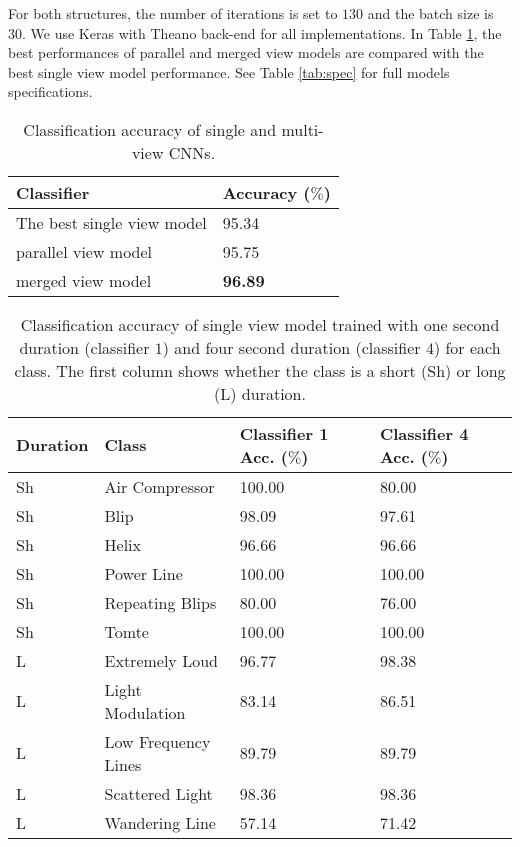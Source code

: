 \documentclass{article}
\begin{document}
For both structures, the number of iterations is set to $130$ and the batch size is $30$.  We use Keras \cite{chollet2015} with Theano \cite{theano} back-end for all implementations.
In Table \ref{tab:sin}, the best performances of parallel and merged view models are compared with the best single view model performance. See Table \ref{tab:spec} for full models specifications. 
 \begin{table}[t!]
\centering
\caption{Classification accuracy of single and multi-view CNNs.}
\label{tab:sin}
\begin{tabular}{l|l}
Classifier     & Accuracy ($\%$) \\ \hline
The best single view model & 95.34 \\
parallel view model & 95.75 \\
merged view model & \textbf{96.89}    
\end{tabular}
\end{table}
\vspace{-3mm}
\begin{table}[b!]
\centering
\caption{Classification accuracy of single view model trained with one second duration (classifier $1$) and four second duration (classifier $4$) for each class. The first column shows whether the class is a short (Sh) or long (L) duration.}
\label{tab:accperclass}
 \begin{adjustbox}{max width=0.495\textwidth}
\begin{tabular}{l|l|l|l}
Duration & Class & Classifier 1 Acc. ($\%$) & Classifier 4 Acc. ($\%$)\\ \hline
Sh & Air Compressor & 100.00 & 80.00 \\  
Sh & Blip & 98.09 & 97.61 \\ 
Sh & Helix & 96.66 & 96.66  \\  
Sh & Power Line & 100.00 & 100.00 \\   
Sh & Repeating Blips & 80.00 & 76.00 \\  
Sh & Tomte & 100.00 & 100.00 \\  \hdashline
L & Extremely Loud & 96.77 & 98.38 \\  
L & Light Modulation & 83.14 & 86.51 \\ 
L & Low Frequency Lines & 89.79 & 89.79  \\  
L & Scattered Light & 98.36 &  98.36\\ 
L & Wandering Line & 57.14 & 71.42 \\     
\end{tabular}
\end{adjustbox}
\end{table}
\end{document}
